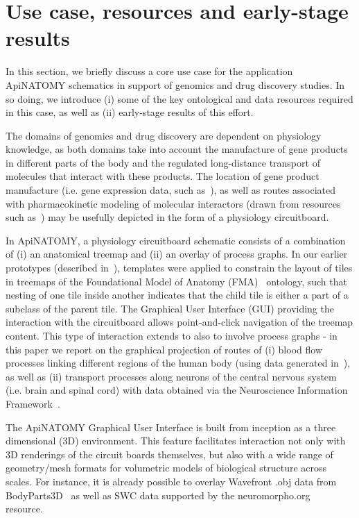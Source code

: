 \section{Use case, resources and early-stage results}
\label{sect:motivation}

In this section, we briefly discuss a core use case for the application ApiNATOMY schematics in support of genomics and drug discovery studies. In so doing, we introduce (i) some of the key ontological and data resources required in this case, as well as (ii) early-stage results of this effort.

The domains of genomics and drug discovery are dependent on physiology knowledge, as both domains take into account the manufacture of gene products in different parts of the body and the regulated long-distance transport of molecules that interact with these products. The location of gene product manufacture (i.e. gene expression data, such as~\cite{EBI}), as well as routes associated with pharmacokinetic modeling of molecular interactors (drawn from resources such as~\cite{HMC+13}) may be usefully depicted in the form of a physiology circuitboard.

In ApiNATOMY, a physiology circuitboard schematic consists of a combination of (i) an anatomical treemap and (ii) an overlay of process graphs. In our earlier prototypes (described in~\cite{BGS12}\cite{KBK14}), templates were applied to constrain the layout of tiles in treemaps of the Foundational Model of Anatomy (FMA)~\cite{RM03} ontology, such that nesting of one tile inside another indicates that the child tile is either a part of a subclass of the parent tile. The Graphical User Interface (GUI) providing the interaction with the circuitboard allows point-and-click navigation of the treemap content. This type of interaction extends to also to involve process graphs - in this paper we report on the graphical projection of routes of (i) blood flow processes linking different regions of the human body (using data generated in~\cite{deB11}), as well as (ii) transport processes along neurons of the central nervous system (i.e. brain and spinal cord) with data obtained via the Neuroscience Information Framework~\cite{Gar+08}.

The ApiNATOMY Graphical User Interface is built from inception as a three dimensional (3D) environment. This feature facilitates interaction not only with 3D renderings of the circuit boards themselves, but also with a wide range of geometry/mesh formats for volumetric models of biological structure across scales. For instance, it is already possible to overlay Wavefront .obj data from BodyParts3D~\cite{MFT+09} as well as SWC data supported by the neuromorpho.org~\cite{Asc06} resource.

